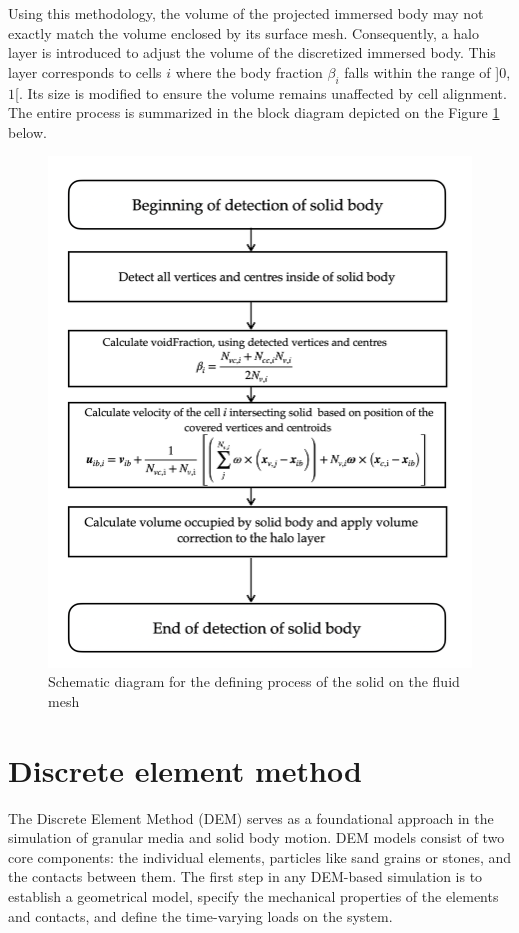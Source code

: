 Using this methodology, the volume of the projected immersed body may not exactly match the volume enclosed by its surface mesh. Consequently, a halo layer is introduced to adjust the volume of the discretized immersed body. This layer corresponds to cells $i$ where the body fraction $\beta_i$ falls within the range of ]$0$, $1$[. Its size is modified to ensure the volume remains unaffected by cell alignment. The entire process is summarized in the block diagram depicted on the Figure \ref{fig:diag} below.
\begin{figure}[!htp]
    \centering
    \includegraphics[width=12cm]{Images/chap3/diag.png}
    \caption{Schematic diagram for the defining process of the solid on the fluid mesh}
    \label{fig:diag}
\end{figure}
\section{Discrete element method}
The Discrete Element Method (DEM) serves as a foundational approach in the simulation of granular media and solid body motion. DEM models consist of two core components: the individual elements, particles like sand grains or stones, and the contacts between them. The first step in any DEM-based simulation is to establish a geometrical model, specify the mechanical properties of the elements and contacts, and define the time-varying loads on the system.

